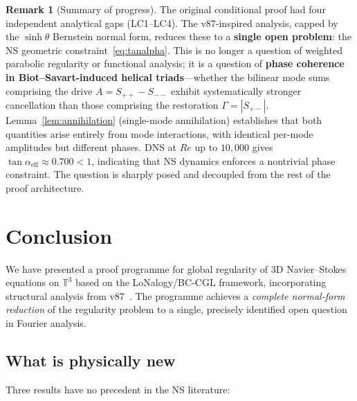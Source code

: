 \documentclass[12pt,a4paper]{article}
\theoremstyle{definition}
\newtheorem{remark}[theorem]{Remark}
\newcommand{\T}{\mathbb{T}}
\begin{document}
\begin{remark}[Summary of progress]
The original conditional proof had four independent analytical gaps
(LC1--LC4). The v87-inspired analysis, capped by the $\sinh\theta$
Bernstein normal form, reduces these to a \textbf{single open problem}:
the NS geometric constraint~\eqref{eq:tanalpha}.
This is no longer a question of weighted parabolic regularity or
functional analysis; it is a question of
\textbf{phase coherence in Biot--Savart-induced helical triads}---whether
the bilinear mode sums comprising the drive $A=S_{++}-S_{--}$ exhibit
systematically stronger cancellation than those comprising the
restoration $\Gamma=|S_{+-}|$.
Lemma~\ref{lem:annihilation} (single-mode annihilation) establishes
that both quantities arise entirely from mode interactions,
with identical per-mode amplitudes but different phases.
DNS at $Re$ up to $10{,}000$ gives
$\tan\alpha_{\mathrm{eff}}\approx 0.700<1$,
indicating that NS dynamics enforces a nontrivial phase constraint.
The question is sharply posed and decoupled from the rest of the
proof architecture.
\end{remark}

\section{Conclusion}

We have presented a proof programme for global regularity of 3D
Navier--Stokes equations on $\T^3$ based on the LoNalogy/BC-CGL
framework, incorporating structural analysis from v87~\cite{v87}.
The programme achieves a \emph{complete normal-form reduction} of the
regularity problem to a single, precisely identified open question in
Fourier analysis.

\subsection*{What is physically new}

Three results have no precedent in the NS literature:
\end{document}
